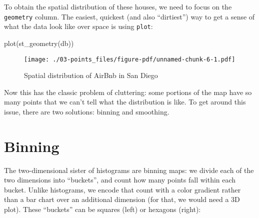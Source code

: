 \documentclass[
  letterpaper,
  krantz2]{style/krantz}
\newenvironment{Shaded}{\begin{snugshade}}{\end{snugshade}}
\newcommand{\FunctionTok}[1]{\textcolor[rgb]{0.28,0.35,0.67}{#1}}
\newcommand{\NormalTok}[1]{\textcolor[rgb]{0.00,0.23,0.31}{#1}}
\begin{document}
To obtain the spatial distribution of these houses, we need to focus on
the \texttt{geometry} column. The easiest, quickest (and also
``dirtiest'') way to get a sense of what the data look like over space
is using \texttt{plot}:

\begin{Shaded}
\begin{Highlighting}[]
\FunctionTok{plot}\NormalTok{(}\FunctionTok{st\_geometry}\NormalTok{(db))}
\end{Highlighting}
\end{Shaded}

\begin{figure}[H]

{\centering \texttt{[image: ./03-points\_files/figure-pdf/unnamed-chunk-6-1.pdf]}

}

\caption{Spatial distribution of AirBnb in San Diego}

\end{figure}

Now this has the classic problem of cluttering: some portions of the map
have so many points that we can't tell what the distribution is like. To
get around this issue, there are two solutions: binning and smoothing.

\hypertarget{binning}{%
\section{Binning}\label{binning}}

The two-dimensional sister of histograms are binning maps: we divide
each of the two dimensions into ``buckets'', and count how many points
fall within each bucket. Unlike histograms, we encode that count with a
color gradient rather than a bar chart over an additional dimension (for
that, we would need a 3D plot). These ``buckets'' can be squares (left)
or hexagons (right):
\end{document}
